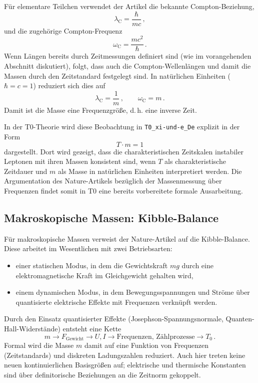 Für elementare Teilchen verwendet der Artikel die bekannte
Compton-Beziehung,
\begin{equation}
  \lambda_{\mathrm{C}} = \frac{\hbar}{m c} \, ,
\end{equation}
und die zugehörige Compton-Frequenz
\begin{equation}
  \omega_{\mathrm{C}} = \frac{m c^2}{\hbar} \, .
\end{equation}
Wenn Längen bereits durch Zeitmessungen definiert sind (wie im vorangehenden
Abschnitt diskutiert), folgt, dass auch die Compton-Wellenlängen und damit die
Massen durch den Zeitstandard festgelegt sind. In natürlichen Einheiten
($\hbar = c = 1$) reduziert sich dies auf
\begin{equation}
  \lambda_{\mathrm{C}} = \frac{1}{m} \, , \qquad \omega_{\mathrm{C}} = m \, .
\end{equation}
Damit ist die Masse eine Frequenzgröße, d.\,h. eine inverse Zeit.

In der T0-Theorie wird diese Beobachtung in \texttt{T0\_xi-und-e\_De} explizit
in der Form
\begin{equation}
  T \cdot m = 1
\end{equation}
dargestellt. Dort wird gezeigt, dass die charakteristischen Zeitskalen
instabiler Leptonen mit ihren Massen konsistent sind, wenn $T$ als
charakteristische Zeitdauer und $m$ als Masse in natürlichen Einheiten
interpretiert werden. Die Argumentation des Nature-Artikels bezüglich der
Massenmessung über Frequenzen findet somit in T0 eine bereits vorbereitete
formale Ausarbeitung.

\subsection{Makroskopische Massen: Kibble-Balance}

Für makroskopische Massen verweist der Nature-Artikel auf die
Kibble-Balance. Diese arbeitet im Wesentlichen mit zwei Betriebsarten:
\begin{itemize}
  \item einer statischen Modus, in dem die Gewichtskraft $m g$ durch eine
        elektromagnetische Kraft im Gleichgewicht gehalten wird,
  \item einem dynamischen Modus, in dem Bewegungsspannungen und Ströme über
        quantisierte elektrische Effekte mit Frequenzen verknüpft werden.
\end{itemize}

Durch den Einsatz quantisierter Effekte (Josephson-Spannungsnormale,
Quanten-Hall-Widerstände) entsteht eine Kette
\begin{equation}
  m \longrightarrow F_{\text{Gewicht}} \longrightarrow
  U, I \longrightarrow \text{Frequenzen, Zählprozesse} \longrightarrow T_0 \, .
\end{equation}
Formal wird die Masse $m$ damit auf eine Funktion von Frequenzen (Zeitstandards)
und diskreten Ladungszahlen reduziert. Auch hier treten keine neuen
kontinuierlichen Basisgrößen auf; elektrische und thermische Konstanten sind
über definitorische Beziehungen an die Zeitnorm gekoppelt.

